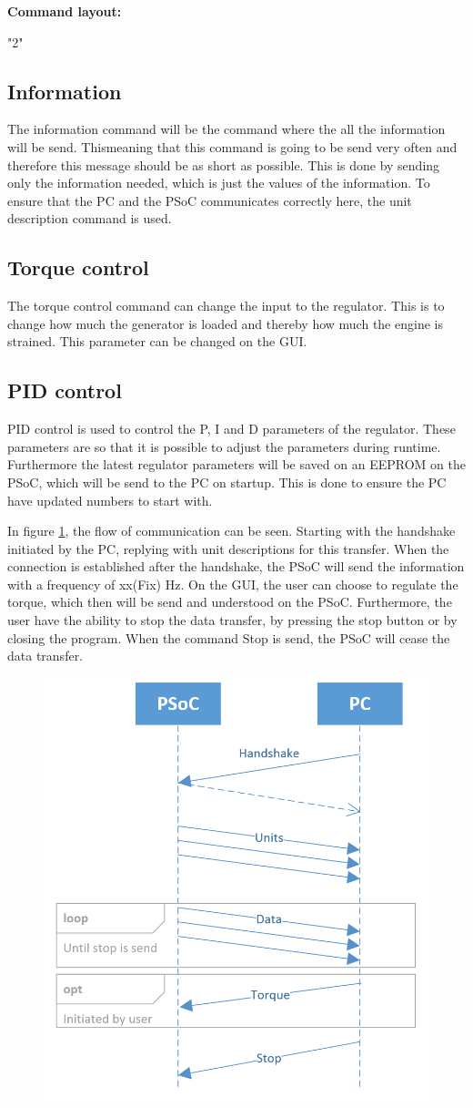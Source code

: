 \textbf{Command layout:}

"2"

\subsection{Information}
The information command will be the command where the all the information will be send. Thismeaning that this command is going to be send very often and therefore this message should be as short as possible. This is done by sending only the information needed, which is just the values of the information. To ensure that the PC and the PSoC communicates correctly here, the unit description command is used. 

\subsection{Torque control}
The torque control command  can change the input to the regulator. This is to change how much the generator is loaded and thereby how much the engine is strained. This parameter can be changed on the GUI. 

\subsection{PID control}
PID control is used to control the P, I and D parameters of the regulator. These parameters are so that it is possible to adjust the parameters during runtime. Furthermore the latest regulator parameters will be saved on an EEPROM on the PSoC, which will be send to the PC on startup. This is done to ensure the PC have updated numbers to start with.
          

In figure \ref{fig:TimingDiagram}, the flow of communication can be seen.
Starting with the handshake initiated by the PC, replying with unit descriptions for this transfer. When the connection is established after the handshake, the PSoC will send the information with a frequency of xx\fxnote(Fix) Hz. On the GUI, the user can choose to regulate the torque, which then will be send and understood on the PSoC. Furthermore, the user have the ability to stop the data transfer, by pressing the stop button or by closing the program. When the command Stop is send, the PSoC will cease the data transfer.

\begin{figure}
\centering
\includegraphics[width=0.5\linewidth]{Protocols/TimingDiagram}
\caption{}
\label{fig:TimingDiagram}
\end{figure}

